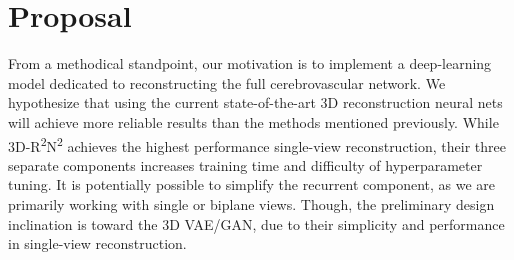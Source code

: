 \documentclass[letterpaper, 10 pt, journal]{ieeeconf}
\begin{document}
\section{Proposal}

From a methodical standpoint, our motivation is to implement a deep-learning model dedicated to reconstructing the full cerebrovascular network.
We hypothesize that using the current state-of-the-art 3D reconstruction neural nets will achieve more reliable results than the methods mentioned previously.
While 3D-R\textsuperscript{2}N\textsuperscript{2} achieves the highest performance single-view reconstruction, their three separate components increases training time and difficulty of hyperparameter tuning.
It is potentially possible to simplify the recurrent component, as we are primarily working with single or biplane views.
Though, the preliminary design inclination is toward the 3D VAE/GAN, due to their simplicity and performance in single-view reconstruction.



\cleardoublepage

\printbibliography



\end{document}
